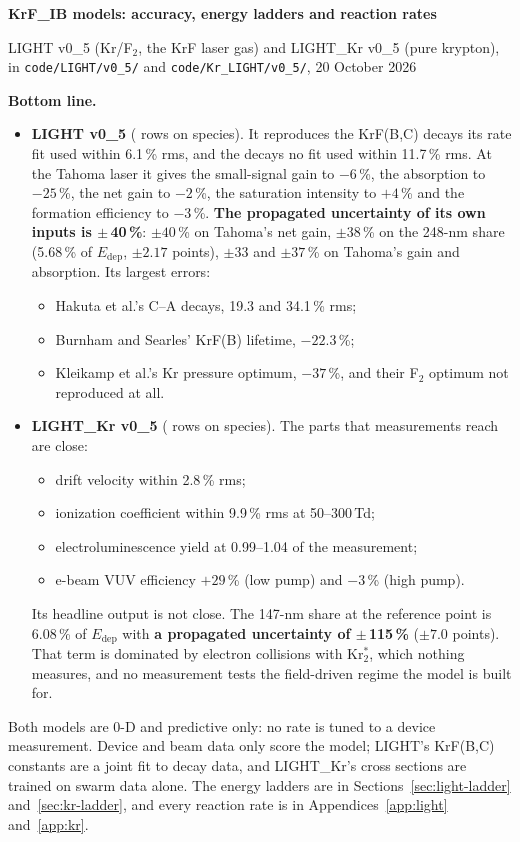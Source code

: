 \documentclass[11pt]{article}
\newcommand{\Krts}{Kr\ensuremath{_2^*}}
\newcommand{\Ft}{F\ensuremath{_2}}
\newcommand{\Edep}{\ensuremath{E_\mathrm{dep}}}
\newcommand{\unc}[1]{\colorbox{hlbg}{\textbf{#1}}}
\begin{document}
{\LARGE\bfseries KrF\_IB models: accuracy, energy ladders and reaction rates}\par
\vspace{4pt}
{\color{ink2} LIGHT v0\_5 (Kr/\Ft, the KrF laser gas) and LIGHT\_Kr v0\_5 (pure
krypton), in \texttt{code/LIGHT/v0\_5/} and \texttt{code/Kr\_LIGHT/v0\_5/},
20 October 2026}
\vspace{6pt}

\textbf{Bottom line.}
\begin{itemize}
\item \textbf{LIGHT v0\_5} (\nrowsLight{} rows on \nspeciesLight{} species). It
  reproduces the KrF(B,C) decays its rate fit used within 6.1\,\% rms, and
  the decays no fit used within 11.7\,\% rms. At the Tahoma laser it gives the
  small-signal gain to $-6$\,\%, the absorption to $-25$\,\%, the net gain to
  $-2$\,\%, the saturation intensity to $+4$\,\% and the formation efficiency
  to $-3$\,\%. \textbf{The propagated uncertainty of its own inputs is
  \unc{$\pm$\,40\,\%}}: $\pm 40$\,\% on Tahoma's net gain, $\pm 38$\,\% on the
  248-nm share (5.68\,\% of \Edep{}, $\pm 2.17$ points), $\pm 33$ and
  $\pm 37$\,\% on Tahoma's gain and absorption. Its largest errors:
  \begin{itemize}
  \item Hakuta et al.'s C--A decays, 19.3 and 34.1\,\% rms;
  \item Burnham and Searles' KrF(B) lifetime, $-22.3$\,\%;
  \item Kleikamp et al.'s Kr pressure optimum, $-37$\,\%, and their \Ft{}
    optimum not reproduced at all.
  \end{itemize}
\item \textbf{LIGHT\_Kr v0\_5} (\nrowsKr{} rows on \nspeciesKr{} species). The
  parts that measurements reach are close:
  \begin{itemize}
  \item drift velocity within 2.8\,\% rms;
  \item ionization coefficient within 9.9\,\% rms at 50--300\,Td;
  \item electroluminescence yield at 0.99--1.04 of the measurement;
  \item e-beam VUV efficiency $+29$\,\% (low pump) and $-3$\,\% (high pump).
  \end{itemize}
  Its headline output is not close. The 147-nm share at the reference point
  is 6.08\,\% of \Edep{} with \textbf{a propagated uncertainty of
  \unc{$\pm$\,115\,\%}} ($\pm 7.0$ points). That term is dominated by electron collisions with
  \Krts{}, which nothing measures, and no measurement tests the field-driven
  regime the model is built for.
\end{itemize}
Both models are 0-D and predictive only: no rate is tuned to a device
measurement. Device and beam data only score the model; LIGHT's KrF(B,C)
constants are a joint fit to decay data, and LIGHT\_Kr's cross sections are
trained on swarm data alone. The energy ladders are in Sections~\ref{sec:light-ladder}
and~\ref{sec:kr-ladder}, and every reaction rate is in Appendices~\ref{app:light}
and~\ref{app:kr}.
\end{document}
